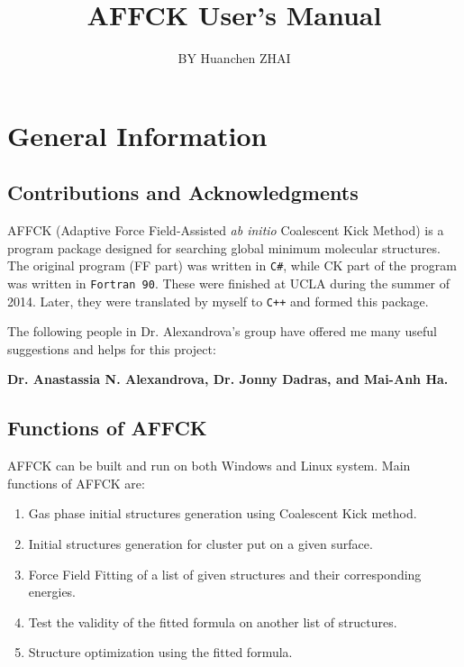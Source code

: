 \documentclass[11pt]{book}
\makeatletter
\newif \if@frontmatter   \@frontmatterfalse
\let \LaTeXmainmatter  = \mainmatter
\renewcommand {\mainmatter}  {\@frontmatterfalse \LaTeXmainmatter}
\makeatother
\begin{document}
\title{\Huge \bfseries AFFCK User's Manual}
\author{BY Huanchen ZHAI}
\maketitle

\newpage
\mbox{}
\thispagestyle{empty}
\newpage

\tableofcontents

\mainmatter


\chapter{General Information}

\section{Contributions and Acknowledgments}

AFFCK (Adaptive Force Field-Assisted \emph{ab initio} Coalescent
Kick Method) is a program package designed for searching global minimum molecular structures.
The original program (FF part) was written in \texttt{C\#}, while CK part of the program was written in \texttt{Fortran 90}.
These were finished at UCLA during the summer of 2014. Later, they were translated by myself to \texttt{C++} and formed this package.

The following people in Dr. Alexandrova's group have offered me many useful suggestions and helps for this project:

\textbf{Dr. Anastassia N. Alexandrova, Dr. Jonny Dadras, and Mai-Anh Ha.}

\section{Functions of AFFCK}

AFFCK can be built and run on both Windows and Linux system. Main functions of AFFCK are:

\begin{enumerate}
	\item Gas phase initial structures generation using Coalescent Kick method.
	\item Initial structures generation for cluster put on a given surface.
	\item Force Field Fitting of a list of given structures and their corresponding energies.
	\item Test the validity of the fitted formula on another list of structures.
	\item Structure optimization using the fitted formula.
\end{enumerate}
\end{document}
